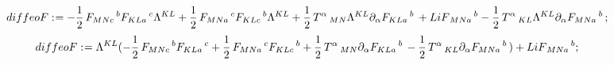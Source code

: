 \documentclass[11pt]{article}
\def\specialcolon{\mathrel{\mathop{:}}\hspace{-.5em}}
\begin{document}
\begin{dmath*}[compact, spread=2pt]
diffeoF\specialcolon{}=  - \frac{1}{2}\, {F}_{M N c}\,^{b} {F}_{K L a}\,^{c} {\Lambda}^{K L} + \frac{1}{2}\, {F}_{M N a}\,^{c} {F}_{K L c}\,^{b} {\Lambda}^{K L} + \frac{1}{2}\, {T}^{\alpha}\,_{M N} {\Lambda}^{K L} {\partial}_{\alpha}{{F}_{K L a}\,^{b}}\,  + {LiF}_{M N a}\,^{b} - \frac{1}{2}\, {T}^{\alpha}\,_{K L} {\Lambda}^{K L} {\partial}_{\alpha}{{F}_{M N a}\,^{b}}\, ;
\end{dmath*}
\begin{dmath*}[compact, spread=2pt]
diffeoF\specialcolon{}= {\Lambda}^{K L} ( - \frac{1}{2}\, {F}_{M N c}\,^{b} {F}_{K L a}\,^{c} + \frac{1}{2}\, {F}_{M N a}\,^{c} {F}_{K L c}\,^{b} + \frac{1}{2}\, {T}^{\alpha}\,_{M N} {\partial}_{\alpha}{{F}_{K L a}\,^{b}}\,  - \frac{1}{2}\, {T}^{\alpha}\,_{K L} {\partial}_{\alpha}{{F}_{M N a}\,^{b}}\, ) + {LiF}_{M N a}\,^{b};
\end{dmath*}
\end{document}
